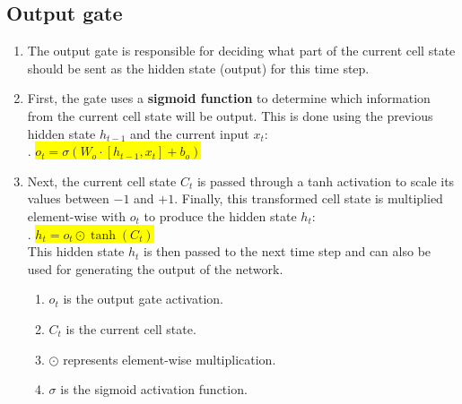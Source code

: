 \subsection{Output gate}

\begin{enumerate}
    \item The output gate is responsible for deciding what part of the current cell state should be sent as the hidden state (output) for this time step.
    \hfill \cite{geeksforgeeks/deep-learning/deep-learning-introduction-to-long-short-term-memory}

    \item First, the gate uses a \textbf{sigmoid function} to determine which information from the current cell state will be output. 
    This is done using the previous hidden state $h_{t-1}$ and the current input $x_t$:
    \hfill \cite{geeksforgeeks/deep-learning/deep-learning-introduction-to-long-short-term-memory}
    \\[0.2cm]
    .\hfill
    \colorbox{yellow}{$o_t=\sigma(W_o\cdot[h_{t-1},x_t]+b_o)$}
    \hfill \cite{geeksforgeeks/deep-learning/deep-learning-introduction-to-long-short-term-memory}

    \item Next, the current cell state $C_t$ is passed through a tanh activation to scale its values between $-1$ and $+1$. 
    Finally, this transformed cell state is multiplied element-wise with $o_t$ to produce the hidden state $h_t$:
    \hfill \cite{geeksforgeeks/deep-learning/deep-learning-introduction-to-long-short-term-memory}
    \\[0.2cm]
    .\hfill
    \colorbox{yellow}{$ h_t=o_t\odot\tanh(C_t) $}
    \hfill \cite{geeksforgeeks/deep-learning/deep-learning-introduction-to-long-short-term-memory}
    \\[0.2cm]
    This hidden state $h_t$ is then passed to the next time step and can also be used for generating the output of the network.
    \hfill \cite{geeksforgeeks/deep-learning/deep-learning-introduction-to-long-short-term-memory}

    \begin{enumerate}
        \item $o_t$ is the output gate activation.
        \hfill \cite{geeksforgeeks/deep-learning/deep-learning-introduction-to-long-short-term-memory}
        
        \item $C_t$ is the current cell state.
        \hfill \cite{geeksforgeeks/deep-learning/deep-learning-introduction-to-long-short-term-memory}
        
        \item $\odot$ represents element-wise multiplication.
        \hfill \cite{geeksforgeeks/deep-learning/deep-learning-introduction-to-long-short-term-memory}
        
        \item $\sigma$ is the sigmoid activation function.
        \hfill \cite{geeksforgeeks/deep-learning/deep-learning-introduction-to-long-short-term-memory}
    \end{enumerate}

\end{enumerate}









